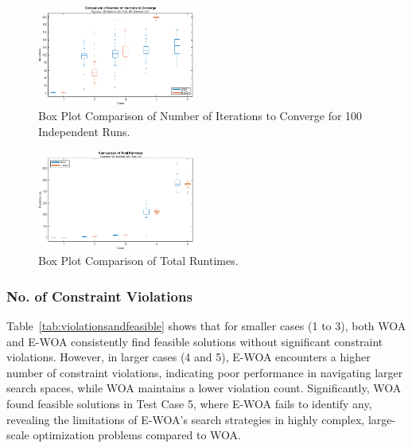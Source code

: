 \documentclass[conference]{IEEEtran}
\begin{document}
\begin{figure}[htbp]
	\centerline{\includegraphics[width=0.46\textwidth]{speedconvergence.png}}
	\vspace{-5pt}
	\caption{Box Plot Comparison of Number of Iterations to Converge for 100 Independent Runs.}
	\vspace{-10pt}
	\label{fig:speedconvergence}
\end{figure}


\begin{figure}[h!]
\centerline{\includegraphics[width=0.46\textwidth]{Runtime.png}}
\vspace{-5pt}
\caption{Box Plot Comparison of Total Runtimes.}
\vspace{-10pt}
\label{fig:Runtime}
\end{figure}


\subsubsection{No. of Constraint Violations}
Table~\ref{tab:violationsandfeasible} shows that for smaller cases (1 to 3), both WOA and E-WOA consistently find feasible solutions without significant constraint violations. However, in larger cases (4 and 5), E-WOA encounters a higher number of constraint violations, indicating poor performance in navigating larger search spaces, while WOA maintains a lower violation count. Significantly, WOA found feasible solutions in Test Case 5, where E-WOA fails to identify any, revealing the limitations of E-WOA's search strategies in highly complex, large-scale optimization problems compared to WOA.
\end{document}
